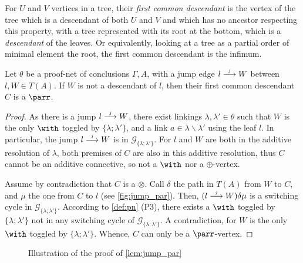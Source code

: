 \documentclass{lmcs}
\newcommand*{\tens}{\otimes} %
\newenvironment{myscope}{
\begin{scope}[every node/.style={circle,thick,draw,minimum size=8mm,inner sep=0}, every edge/.style={->,draw=black,thick}, every path/.style={-,draw=black,thick}]
}{
\end{scope}
}
\newcommand{\edgelabel}[1]{edge node[draw=none, sloped, align=center]{#1 \\}}
\newcommand*{\G}{\mathcal{G}}
\newcommand{\symboltext}[2]{\mathrel{\overset{\makebox[0pt]{\mbox{\normalfont\tiny\sffamily \ensuremath{#1}}}}{#2}}} %
\newcommand{\jump}{\symboltext{j}{\longrightarrow}}
\begin{document}
For $U$ and $V$ vertices in a tree, their \emph{first common descendant} is the vertex of the tree which is a descendant of both $U$ and $V$ and which has no ancestor respecting this property, with a tree represented with its root at the bottom, which is a \emph{descendant} of the leaves.
Or equivalently, looking at a tree as a partial order of minimal element the root, the first common descendant is the infimum.

\begin{lem}
\label{lem:jump_par}
Let $\theta$ be a proof-net of conclusions $\Gamma,A$, with a jump edge $l\jump W$ between $l,W\in T(A)$.
If $W$ is not a descendant of $l$, then their first common descendant $C$ is a $\parr$.
\end{lem}
\begin{proof}
As there is a jump $l\jump W$, there exist linkings $\lambda,\lambda'\in\theta$ such that $W$ is the only $\with$ toggled by $\{\lambda;\lambda'\}$, and a link $a\in\lambda\backslash\lambda'$ using the leaf $l$. In particular, the jump $l\jump W$ is in $\G_{\{\lambda;\lambda'\}}$.
For $l$ and $W$ are both in the additive resolution of $\lambda$, both premises of $C$ are also in this additive resolution, thus $C$ cannot be an additive connective, so not a $\with$ nor a $\oplus$-vertex.

Assume by contradiction that $C$ is a $\tens$.
Call $\delta$ the path in $T(A)$ from $W$ to $C$, and $\mu$ the one from $C$ to $l$ (see \autoref{fig:jump_par}).
Then, $(l\jump W)\delta\mu$ is a switching cycle in $\G_{\{\lambda;\lambda'\}}$.
According to \autoref{def:pn} (P3), there exists a $\with$ toggled by $\{\lambda;\lambda'\}$ not in any switching cycle of $\G_{\{\lambda;\lambda'\}}$.
A contradiction, for $W$ is the only $\with$ toggled by $\{\lambda;\lambda'\}$.
Whence, $C$ can only be a $\parr$-vertex.
\end{proof}

\begin{figure}
\begin{adjustbox}{}
\end{adjustbox}
\caption{Illustration of the proof of \autoref{lem:jump_par}}
\label{fig:jump_par}
\end{figure}
\end{document}
